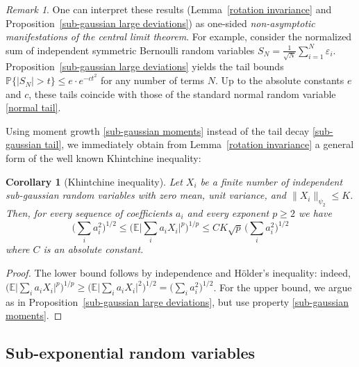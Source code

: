 \documentclass[10pt, openany]{book}
\newtheorem{corollary}[theorem]{Corollary}
\theoremstyle{remark}
\newtheorem{remark}[theorem]{Remark}
\def \E {\mathbb{E}}
\def \P {\mathbb{P}}
\def \e {\varepsilon}
\def \psitwo {{\psi_2}}
\begin{document}
\begin{remark}
  One can interpret these results (Lemma~\ref{rotation invariance} and Proposition~\ref{sub-gaussian large deviations})
  as one-sided {\em non-asymptotic manifestations of the central limit theorem}. For example, 
  consider the normalized sum of independent symmetric Bernoulli random variables
  $S_N = \frac{1}{\sqrt{N}} \sum_{i=1}^N \e_i$. Proposition~\ref{sub-gaussian large deviations}
  yields the tail bounds $\P \{ |S_N| > t \}  \le e \cdot e^{-ct^2}$ for any number of terms $N$. 
  Up to the absolute constants $e$ and $c$, these tails coincide with those of the standard normal random variable
  \eqref{normal tail}.
  
\end{remark}

Using moment growth \eqref{sub-gaussian moments}
instead of the tail decay \eqref{sub-gaussian tail}, we immediately 
obtain from Lemma~\ref{rotation invariance} a general form of the well known Khintchine inequality:

\begin{corollary}[Khintchine inequality]					\label{Khintchine}		
  Let $X_i$ be a finite number of independent sub-gaussian random variables
  with zero mean, unit variance, and $\|X_i\|_{\psitwo} \le K$.
  Then, for every sequence of coefficients $a_i$ and every exponent $p \ge 2$ we have
  $$
  \big( \sum_i a_i^2 \big)^{1/2}
  \le \big( \E \big| \sum_i a_i X_i \big|^p \big)^{1/p}
  \le C K \sqrt{p} \, \big( \sum_i a_i^2 \big)^{1/2}
  $$   
  where $C$ is an absolute constant.
\end{corollary}

\begin{proof}
The lower bound follows by independence and H\"older's inequality: indeed, 
$\big( \E \big| \sum_i a_i X_i \big|^p \big)^{1/p} \ge \big( \E \big| \sum_i a_i X_i \big|^2 \big)^{1/2}
= \big( \sum_i a_i^2 \big)^{1/2}$. For the upper bound, we argue as in Proposition~\ref{sub-gaussian large deviations},
but use property \eqref{sub-gaussian moments}.
\end{proof}




\subsection{Sub-exponential random variables}	 \label{s: sub-exponential}
\end{document}
